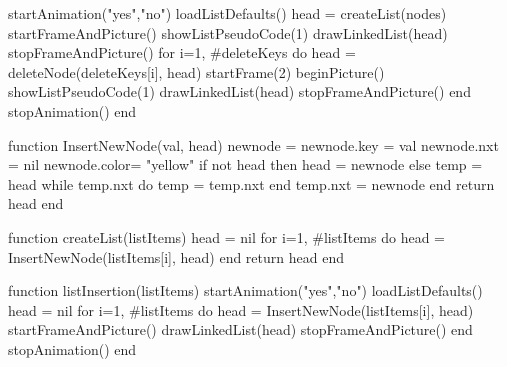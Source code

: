 	startAnimation("yes","no")
	loadListDefaults()
	head = createList(nodes)
	startFrameAndPicture()
	showListPseudoCode(1)
	drawLinkedList(head)
	stopFrameAndPicture()
	for i=1, #deleteKeys do 
		head = deleteNode(deleteKeys[i], head)
		startFrame(2)
		beginPicture()
		showListPseudoCode(1)
		drawLinkedList(head)
		stopFrameAndPicture()
	end
	stopAnimation()
end

function InsertNewNode(val, head)
	newnode = {}
	newnode.key = val
	newnode.nxt = nil
	newnode.color= "yellow"
	if not head then
		head = newnode
	else
		temp = head
		while temp.nxt do
			temp = temp.nxt
		end
		temp.nxt = newnode
	end
	return head
end

function createList(listItems)
	head = nil
	for i=1, #listItems do
		head = InsertNewNode(listItems[i], head)
	end	
	return head
end

function listInsertion(listItems)
	startAnimation("yes","no")
	loadListDefaults()
	head = nil
	for i=1, #listItems do
		head = InsertNewNode(listItems[i], head)
		startFrameAndPicture()
		drawLinkedList(head)
		stopFrameAndPicture()
	end	
	stopAnimation()
end

\stopluacode
